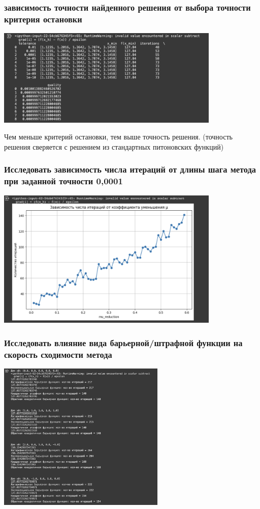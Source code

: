 \documentclass[12pt,pdf,hyperref={unicode}]{beamer}
\begin{document}
\begin{frame}
\frametitle{ зависимость точности найденного решения от выбора точности критерия остановки}
\begin{center}
    \includegraphics[width=0.8\textwidth]{tolerance.png}
\end{center}

Чем меньше критерий остановки, тем выше точность решения. (точность решения сверяется с решением из стандартных питоновских функций)
\end{frame}

\begin{frame}
\frametitle{Исследовать зависимость числа итераций от длины шага метода при заданной точности 0,0001}
\begin{center}
    \includegraphics[width=0.8\textwidth]{mu.png}
\end{center}

\end{frame}

\begin{frame}
\frametitle{Исследовать влияние вида барьерной/штрафной функции на скорость сходимости метода}
\begin{center}
    \includegraphics[width=0.6\textwidth]{barrier.png}
\end{center}

\end{frame}
\end{document}
